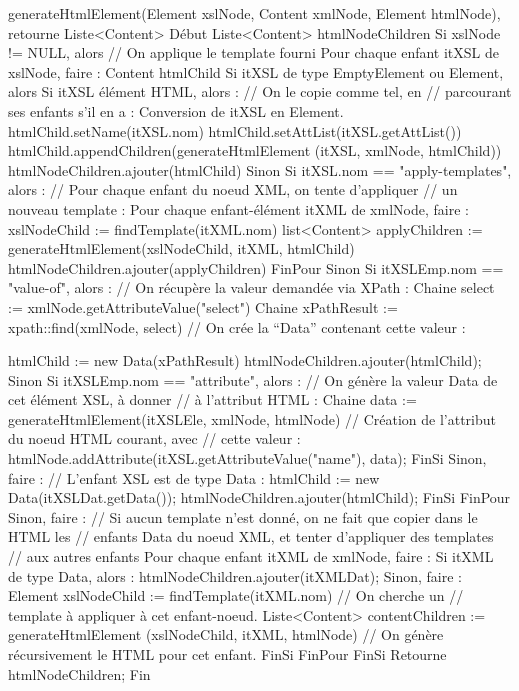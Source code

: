 \documentclass[10pt,a4paper]{article}
\begin{document}
\begin{verbatimtab}
generateHtmlElement(Element xslNode, Content xmlNode, Element htmlNode), retourne Liste<Content>
Début
	Liste<Content> htmlNodeChildren
	Si xslNode != NULL, alors // On applique le template fourni
		Pour chaque enfant itXSL de xslNode, faire :
			Content htmlChild
			Si itXSL de type EmptyElement ou Element, alors
				Si itXSL élément HTML, alors :  // On le copie comme tel, en 
				// parcourant ses enfants s’il en a :
					Conversion de itXSL en Element.
					htmlChild.setName(itXSL.nom)
					htmlChild.setAttList(itXSL.getAttList())
					htmlChild.appendChildren(generateHtmlElement
						(itXSL, xmlNode, htmlChild))
					htmlNodeChildren.ajouter(htmlChild)
				Sinon Si itXSL.nom == "apply-templates", alors :
				// Pour chaque enfant du noeud XML, on tente d’appliquer 
				// un nouveau template :
					Pour chaque enfant-élément itXML de xmlNode, faire :
						xslNodeChild := findTemplate(itXML.nom)
						list<Content> applyChildren :=
						generateHtmlElement(xslNodeChild, itXML, htmlChild)
						htmlNodeChildren.ajouter(applyChildren)
					FinPour
				Sinon Si itXSLEmp.nom == "value-of", alors :
					// On récupère la valeur demandée via XPath :
					Chaine select := xmlNode.getAttributeValue("select")
					Chaine xPathResult := xpath::find(xmlNode, select)
					// On crée la “Data” contenant cette valeur :

					htmlChild := new Data(xPathResult)
					htmlNodeChildren.ajouter(htmlChild);
				Sinon Si itXSLEmp.nom == "attribute", alors :
					// On génère la valeur Data de cet élément XSL, à donner 
					// à l’attribut HTML :
					Chaine data := generateHtmlElement(itXSLEle, xmlNode, htmlNode)
					// Création de l’attribut du noeud HTML courant, avec 
					// cette valeur :
					htmlNode.addAttribute(itXSL.getAttributeValue("name"), data);
				FinSi                   
			Sinon, faire : // L’enfant XSL est de type Data :
				htmlChild := new Data(itXSLDat.getData());
				htmlNodeChildren.ajouter(htmlChild);
			FinSi
		FinPour
	Sinon, faire : // Si aucun template n’est donné, on ne fait que copier dans le HTML les 
	// enfants Data du noeud XML, et tenter d’appliquer des templates 
	// aux autres enfants
		Pour chaque enfant itXML de xmlNode, faire :
			Si itXML de type Data, alors :
				htmlNodeChildren.ajouter(itXMLDat);
			Sinon, faire :
				Element xslNodeChild := findTemplate(itXML.nom) // On cherche un 
				// template à appliquer à cet enfant-noeud.
				Liste<Content> contentChildren := generateHtmlElement
					(xslNodeChild, itXML, htmlNode) 
				// On génère récursivement le HTML pour cet enfant.
			FinSi
		FinPour
	FinSi
	Retourne htmlNodeChildren;
Fin
\end{verbatimtab}
\end{document}
